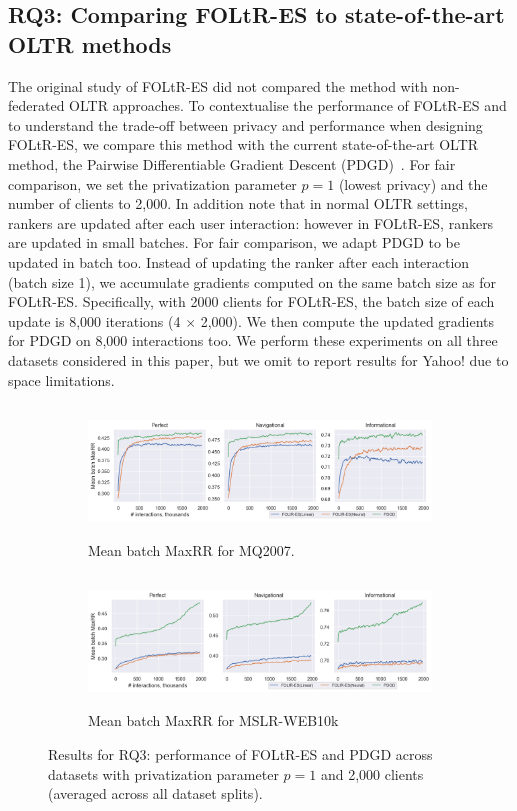 \subsection{RQ3: Comparing FOLtR-ES to state-of-the-art OLTR methods}
The original study of FOLtR-ES did not compared the method with non-federated OLTR approaches. To contextualise the performance of FOLtR-ES and to understand the trade-off between privacy and performance when designing FOLtR-ES, we compare this method with the current state-of-the-art OLTR method, the Pairwise Differentiable Gradient Descent (PDGD)~\cite{oosterhuis2018differentiable}. For fair comparison, we set the privatization parameter $p=1$ (lowest privacy) and the number of clients to 2,000. In addition note that in normal OLTR settings, rankers are updated after each user interaction: however in FOLtR-ES, rankers are updated in small batches. For fair comparison, we adapt PDGD to be updated in batch too. Instead of updating the ranker after each interaction (batch size 1), we accumulate gradients computed on the same batch size as for FOLtR-ES. Specifically, with 2000 clients for FOLtR-ES, the batch size of each update is 8,000 iterations (4 $\times$ 2,000). We then compute the updated gradients for PDGD on 8,000 interactions too. %
We perform these experiments on all three datasets considered in this paper, but we omit to report results for Yahoo! due to space limitations. 

\begin{figure}[t]
	\centering
	\begin{subfigure}{1\textwidth} \centering
		\includegraphics[width=13cm, height=3.5cm]{images/RQ3/mq2007_foltr_PDGD_mrr_c2000_p1.0.png}
		\caption{Mean batch MaxRR for MQ2007.}
		\label{fig:mq2007-rq3}
	\end{subfigure}
	\begin{subfigure}{1\textwidth} \centering
		\includegraphics[width=13cm, height=3.5cm]{images/RQ3/mslr10k_foltr_PDGD_mrr_c2000_p1.0.png}
		\caption{Mean batch MaxRR for MSLR-WEB10k}
		\label{fig:mslr10k-rq3}
	\end{subfigure}
	\caption{Results for RQ3: performance of FOLtR-ES and PDGD across datasets with privatization parameter $p=1$ and 2,000 clients (averaged across all dataset splits). \label{fig:RQ3}} 
\end{figure}

